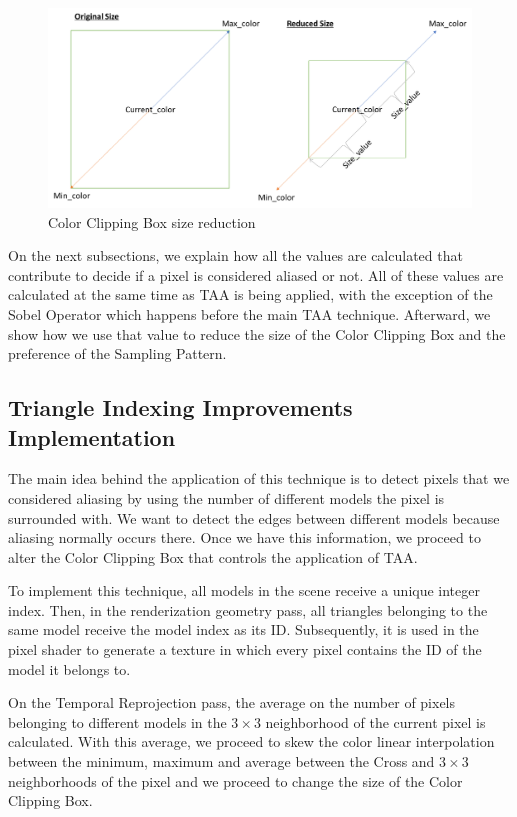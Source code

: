 \documentclass[pregrado]{tesis-usb} %
\begin{document}
\begin{figure}[!hbt]
	\centering
	\includegraphics[scale=0.7]{images/clipping_box_reduction.png}
	\caption{Color Clipping Box size reduction}\label{fig:colorclippingboxredux}
\end{figure}

On the next subsections, we explain how all the values are calculated that contribute to decide if a pixel is considered aliased or not. All of these values are calculated at the same time as TAA is being applied, with the exception of the Sobel Operator which happens before the main TAA technique. Afterward, we show how we use that value to reduce the size of the Color Clipping Box and the preference of the Sampling Pattern.

\subsection{Triangle Indexing Improvements Implementation}
The main idea behind the application of this technique is to detect pixels that we considered aliasing by using the number of different models the pixel is surrounded with. We want to detect the edges between different models because aliasing normally occurs there. Once we have this information, we proceed to alter the Color Clipping Box that controls the application of TAA.

To implement this technique, all models in the scene receive a unique integer index. Then, in the renderization geometry pass, all triangles belonging to the same model receive the model index as its ID. Subsequently, it is used in the pixel shader to generate a texture in which every pixel contains the ID of the model it belongs to.

On the Temporal Reprojection pass, the average on the number of pixels belonging to different models in the $3\times 3$ neighborhood of the current pixel is calculated. With this average, we proceed to skew the color linear interpolation between the minimum, maximum and average between the Cross and $3\times 3$ neighborhoods of the pixel and we proceed to change the size of the Color Clipping Box. 
\end{document}
